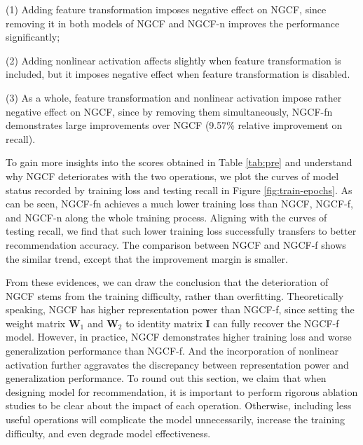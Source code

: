 (1) Adding feature transformation imposes negative effect on NGCF, since removing it in both models of NGCF and NGCF-n improves the performance significantly; 

(2) Adding nonlinear activation affects slightly when feature transformation is included, but it imposes negative effect when feature transformation is disabled. %

(3) As a whole, feature transformation and nonlinear activation impose rather negative effect on NGCF, since by removing them simultaneously, NGCF-fn demonstrates large improvements over NGCF (9.57\% relative improvement on recall). 

To gain more insights into the scores obtained in Table \ref{tab:pre} and understand why NGCF deteriorates with the two operations, we plot the curves of model status recorded by training loss and testing recall in Figure \ref{fig:train-epochs}. 
As can be seen, NGCF-fn achieves a much lower training loss than NGCF, NGCF-f, and NGCF-n along the whole training process. Aligning with the curves of testing recall, we find that such lower training loss successfully transfers to better recommendation accuracy.
The comparison between NGCF and NGCF-f shows the similar trend, except that the improvement margin is smaller. 

From these evidences, we can draw the conclusion that the deterioration of NGCF stems from the training difficulty, rather than overfitting. 
Theoretically speaking, NGCF has higher representation power than NGCF-f, since setting the weight matrix $\textbf{W}_1$ and $\textbf{W}_2$ to identity matrix $\textbf{I}$ can fully recover the NGCF-f model. However, in practice, NGCF demonstrates higher training loss and worse generalization performance than NGCF-f. 
And the incorporation of nonlinear activation further aggravates the discrepancy between representation power and generalization performance. To round out this section, we claim that when designing model for recommendation, it is important to perform rigorous ablation studies to be clear about the impact of each operation. Otherwise, including less useful operations will complicate the model unnecessarily, increase the training difficulty, and even degrade model effectiveness. 